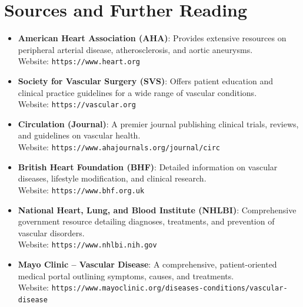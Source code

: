 \section*{Sources and Further Reading}
\begin{itemize}
    \item \textbf{American Heart Association (AHA)}: Provides extensive resources on peripheral arterial disease, atherosclerosis, and aortic aneurysms. \\
    Website: \texttt{https://www.heart.org}
    \item \textbf{Society for Vascular Surgery (SVS)}: Offers patient education and clinical practice guidelines for a wide range of vascular conditions. \\
    Website: \texttt{https://vascular.org}
    \item \textbf{Circulation (Journal)}: A premier journal publishing clinical trials, reviews, and guidelines on vascular health. \\
    Website: \texttt{https://www.ahajournals.org/journal/circ}
    \item \textbf{British Heart Foundation (BHF)}: Detailed information on vascular diseases, lifestyle modification, and clinical research. \\
    Website: \texttt{https://www.bhf.org.uk}
    \item \textbf{National Heart, Lung, and Blood Institute (NHLBI)}: Comprehensive government resource detailing diagnoses, treatments, and prevention of vascular disorders. \\
    Website: \texttt{https://www.nhlbi.nih.gov}
    \item \textbf{Mayo Clinic -- Vascular Disease}: A comprehensive, patient-oriented medical portal outlining symptoms, causes, and treatments. \\
    Website: \texttt{https://www.mayoclinic.org/diseases-conditions/vascular-disease}
\end{itemize}
